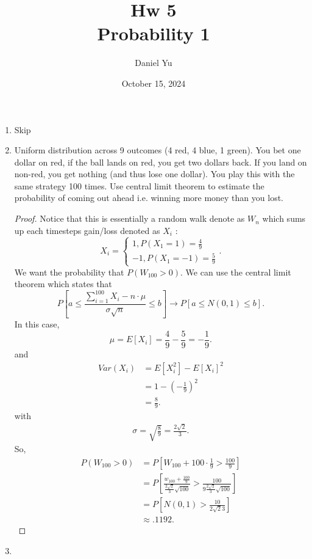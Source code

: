 \documentclass[a4paper]{article}
\title{\Huge{Hw 5}\\Probability 1}
\author{\huge{Daniel Yu}}
\date{October 15, 2024}
\begin{document}
\maketitle
\newpage%
\pagebreak
\begin{enumerate}
  \item Skip
  \item Uniform distribution across 9 outcomes (4 red, 4 blue, 1 green). You bet one dollar on red, if the ball lands on red, you get two dollars back. If you land on non-red, you get nothing (and thus lose one dollar). You play this with the same strategy 100 times. Use central limit theorem to estimate the probability of coming out ahead i.e. winning more money than you lost. 
    \begin{proof}
      Notice that this is essentially a random walk denote as $W_n$ which sums up each timesteps gain/loss denoted as $X_i$ :
      \[
      X_i = \begin{cases}
        1, P(X_1 = 1) = \frac{4}{9} \\
        -1, P(X_1 = -1) = \frac{5}{9}
      \end{cases}
      .\]
      We want the probability that $P(W_{100} > 0)$. We can use the central limit theorem which states that
      \[
        P[a \leq \frac{\sum_{i=1}^{100} X_i - n \cdot \mu}{\sigma \sqrt{n}} \leq b] \to P[a \leq N(0,1) \leq b] 
      .\] 
      In this case,
      \[
        \mu = E[X_i] = \frac{4}{9} - \frac{5}{9} = -\frac{1}{9}
      .\]
      and 
      \begin{align*}
        Var(X_i) &= E[X_i^{2}] - E[X_i]^{2} \\
                 &= 1 - (-\frac{1}{9})^{2} \\
                 &= \frac{8}{9}
      .\end{align*}
      with
      \begin{align*}
        \sigma = \sqrt{\frac{8}{9}} = \frac{2\sqrt{2} }{3}  
      .\end{align*}
      So,
      \begin{align*}
        P(W_{100} > 0) &= P[W_{100} + 100 \cdot \frac{1}{9} > \frac{100}{9}] \\
                       &= P[\frac{w_{100}+\frac{100}{9}}{\frac{2\sqrt{2} }{3} \sqrt{100}} > \frac{100}{9 \frac{2\sqrt{2}}{3} \sqrt{100}}] \\
                       &= P[N(0,1) > \frac{10}{2 \sqrt{2} 3}] \\
                       &\approx .1192 
      .\end{align*}
    \end{proof}
  \item  
\end{enumerate} 
\end{document}
